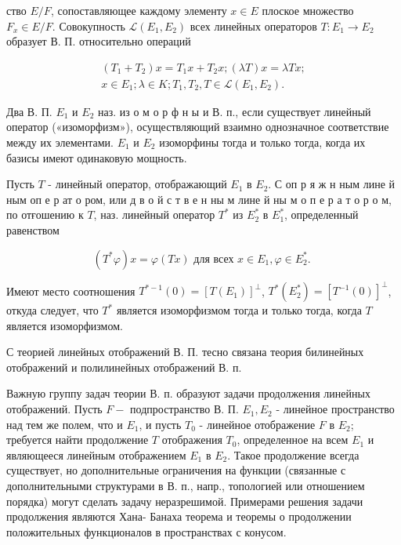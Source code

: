 \documentclass[10pt]{article}
\begin{document}
ство $E / F$, сопоставляющее каждому элементу $x \in E$ плоское множество $F_{x} \in E / F$. Совокупность $\mathscr{L}\left(E_{1}, E_{2}\right)$ всех линейных операторов $T: E_{1} \rightarrow E_{2}$ образует В. П. относительно операций



\[

\begin{gathered}

\left(T_{1}+T_{2}\right) x=T_{1} x+T_{2} x ;(\lambda T) x=\lambda T x ; \\

x \in E_{1} ; \lambda \in K ; T_{1}, T_{2}, T \in \mathscr{L}\left(E_{1}, E_{2}\right) .

\end{gathered}

\]



Два В. П. $E_{1}$ и $E_{2}$ наз. из о м о р ф н ы и В. п., если существует линейный оператор («изоморфизм»), осуществляющий взаимно однозначное соответствие между их элементами. $E_{1}$ и $E_{2}$ изоморфины тогда и только тогда, когда их базисы имеют одинаковую мощность.



Пусть $T$ - линейный оператор, отображающий $E_{1}$ в $E_{2}$. С оп р я ж н ным лине й ным оп е р ат о ром, или д в о й с т в е н ны м лине й ны м о п е р а т о р о м, по отғошению к $T$, наз. линейный оператор $T^{*}$ из $E_{2}^{*}$ в $E_{1}^{*}$, определенный равенством



\[

\left(T^{*} \varphi\right) x=\varphi(T x) \text { для всех } x \in E_{1}, \varphi \in E_{2}^{*} \text {. }

\]



Имеют место соотношения $T^{*-1}(0)=\left[T\left(E_{1}\right)\right]^{\perp}$, $T^{*}\left(E_{2}^{*}\right)=\left[T^{-1}(0)\right]^{\perp}$, откуда следует, что $T^{*}$ является изоморфизмом тогда и только тогда, когда $T$ является изоморфизмом.



С теорией линейных отображений В. П. тесно связана теория билинейных отображений и полилинейных отображений В. п.



Важную группу задач теории В. п. образуют задачи продолжения линейных отображений. Пусть $F-$ подпространство В. П. $E_{1}, E_{2}$ - линейное пространство над тем же полем, что и $E_{1}$, и пусть $T_{0}$ - линейное отображение $F$ в $E_{2}$; требуется найти продолжение $T$ отображения $T_{0}$, определенное на всем $E_{1}$ и являющееся линейным отображением $E_{1}$ в $E_{2}$. Такое продолжение всегда существует, но дополнительные ограничения на функции (связанные с дополнительными структурами в В. п., напр., топологией или отношением порядка) могут сделать задачу неразрешимой. Примерами решения задачи продолжения являются Хана- Банаха теорема и теоремы о продолжении положительных функционалов в пространствах с конусом.
\end{document}
